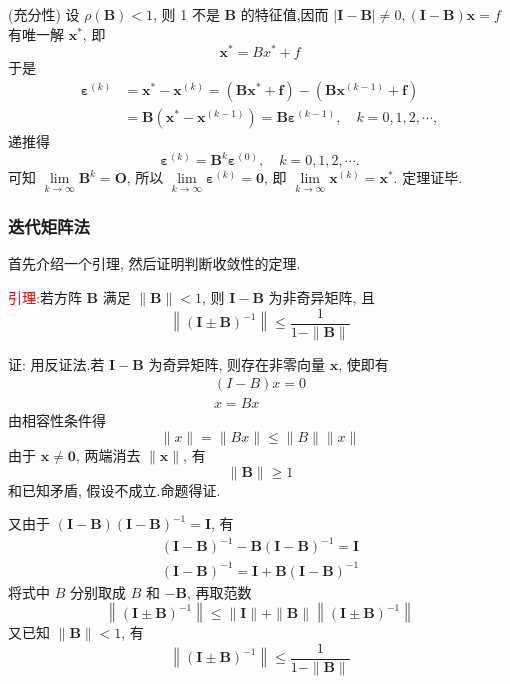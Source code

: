 (充分性) 设 $ \rho(\boldsymbol{B})<1 $, 则 1 不是 $ \boldsymbol{B} $ 的特征值,因而 $ |\boldsymbol{I}-\boldsymbol{B}| \neq 0,(\boldsymbol{I}-\boldsymbol{B}) \boldsymbol{x}=f $
有唯一解 $ \boldsymbol{x}^{*} $, 即
$$
\boldsymbol{x}^{*}=B x^{*}+f 
$$
于是
$$
\begin{aligned}
\boldsymbol{\varepsilon}^{(k)} & =\boldsymbol{x}^{*}-\boldsymbol{x}^{(k)}=\left(\boldsymbol{B} \boldsymbol{x}^{*}+\boldsymbol{f}\right)-\left(\boldsymbol{B} \boldsymbol{x}^{(k-1)}+\boldsymbol{f}\right) \\
& =\boldsymbol{B}\left(\boldsymbol{x}^{*}-\boldsymbol{x}^{(k-1)}\right)=\boldsymbol{B} \boldsymbol{\varepsilon}^{(k-1)}, \quad k=0,1,2, \cdots,
\end{aligned}
$$
递推得
$$
\boldsymbol{\varepsilon}^{(k)}=\boldsymbol{B}^{k} \boldsymbol{\varepsilon}^{(0)}, \quad k=0,1,2, \cdots .
$$
可知 $ \lim\limits _{k \rightarrow \infty} \boldsymbol{B}^{k}=\boldsymbol{O} $, 所以 $ \lim\limits _{k \rightarrow \infty} \boldsymbol{\varepsilon}^{(k)}=\mathbf{0} $, 即 $ \lim\limits _{k \rightarrow \infty} \boldsymbol{x}^{(k)}=\boldsymbol{x}^{*} $.
定理证毕.


\subsubsection{迭代矩阵法}
首先介绍一个引理, 然后证明判断收敛性的定理.

\textcolor{red}{引理:}若方阵 $ \boldsymbol{B} $ 满足 $ \|\boldsymbol{B}\|<1 $, 则 $ \boldsymbol{I}-\boldsymbol{B} $ 为非奇异矩阵, 且
$$
\left\|(\boldsymbol{I} \pm \boldsymbol{B})^{-1}\right\| \leqslant \frac{1}{1-\|\boldsymbol{B}\|}
$$

证: 用反证法.若 $ \boldsymbol{I}-\boldsymbol{B} $ 为奇异矩阵, 则存在非零向量 $ \boldsymbol{x} $, 使即有
$$
\begin{array}{c}
(I-B) x=0 \\
x=B x
\end{array}
$$
由相容性条件得
$$
\|x\|=\|B x\| \leqslant\|B\|\|x\|
$$
由于 $ \boldsymbol{x} \neq \mathbf{0} $, 两端消去 $ \|\boldsymbol{x}\| $, 有
$$
\|\boldsymbol{B}\| \geqslant 1
$$
和已知矛盾, 假设不成立.命题得证.

又由于 $ (\boldsymbol{I}-\boldsymbol{B})(\boldsymbol{I}-\boldsymbol{B})^{-1}=\boldsymbol{I} $, 有
$$
\begin{array}{l}
(\boldsymbol{I}-\boldsymbol{B})^{-1}-\boldsymbol{B}(\boldsymbol{I}-\boldsymbol{B})^{-1}=\boldsymbol{I} \\
(\boldsymbol{I}-\boldsymbol{B})^{-1}=\boldsymbol{I}+\boldsymbol{B}(\boldsymbol{I}-\boldsymbol{B})^{-1}
\end{array}
$$
将式中 $ B $ 分别取成 $ B $ 和 $ -\boldsymbol{B} $, 再取范数
$$
\left\|(\boldsymbol{I} \pm \boldsymbol{B})^{-1}\right\| \leqslant\|\boldsymbol{I}\|+\|\boldsymbol{B}\|\left\|(\boldsymbol{I} \pm \boldsymbol{B})^{-1}\right\|
$$
又已知 $ \|\boldsymbol{B}\|<1 $, 有
$$
\left\|(\boldsymbol{I} \pm \boldsymbol{B})^{-1}\right\| \leqslant \frac{1}{1-\|\boldsymbol{B}\|}
$$

